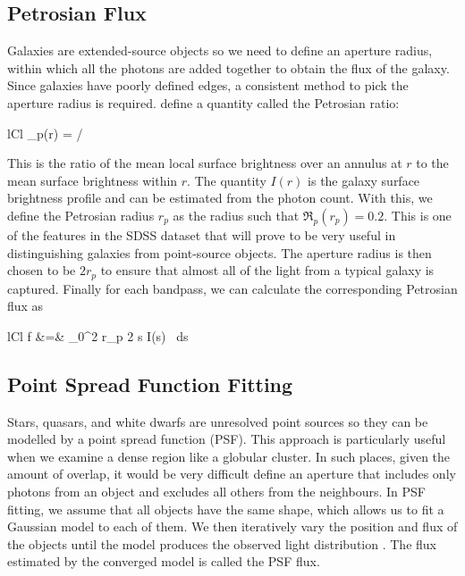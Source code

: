 \subsection{Petrosian Flux} 
Galaxies are extended-source objects so we need to define an aperture radius, within which
all the photons are added together to obtain the flux of the galaxy. Since galaxies have
poorly defined edges, a consistent method to pick the aperture radius is required.
 define a quantity called the Petrosian ratio:
	\begin{IEEEeqnarray*}{lCl}
		_p(r) = 
							\bigg/ 
	\end{IEEEeqnarray*}
This is the ratio of the mean local surface brightness over an annulus at $r$ to the mean
surface brightness within $r$. The quantity $I(r)$ is the galaxy surface brightness profile
and can be estimated from the photon count. With this, we define the Petrosian
radius $r_p$ as the radius such that $\mathfrak{R}_p(r_p) = 0.2$. This is one of the features
in the SDSS dataset that will prove to be very useful in distinguishing galaxies from
point-source objects. The aperture radius is then chosen to be $2r_p$ to ensure that almost
all of the light from a typical galaxy is captured. Finally for each bandpass, we can calculate
the corresponding Petrosian flux as
	\begin{IEEEeqnarray*}{lCl}
		f &=& \int_{0}^{2 r_p} 2 \pi s I(s) \, ds
	\end{IEEEeqnarray*}

\subsection{Point Spread Function Fitting} 

Stars, quasars, and white dwarfs are unresolved point sources so they can be modelled by a point
spread function (PSF). This approach is particularly useful when we examine a dense region like a
globular cluster. In such places, given the amount of overlap, it would be very difficult define an
aperture that includes only photons from an object and excludes all others from the neighbours. In
PSF fitting, we assume that all objects have the same shape, which allows us to fit a Gaussian model
to each of them. We then iteratively vary the position and flux of the objects until the model
produces the observed light distribution \cite[Chapter 10]{palmer01}. The flux estimated by the
converged model is called the PSF flux.

